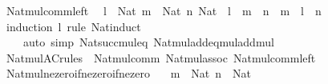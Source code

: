 \begin{isabellebody}
\endisatagproof
{\isafoldproof}%
%
\isadelimproof
\isanewline
%
\endisadelimproof
\isanewline
{}\isamarkupfalse%
\ Nat{\isacharunderscore}{\kern0pt}mul{\isacharunderscore}{\kern0pt}comm{\isacharunderscore}{\kern0pt}left{\isacharcolon}{\kern0pt}\isanewline
\ \ {\isachardoublequoteopen}{\isasymlbrakk}l\ {\isacharcolon}{\kern0pt}\ Nat{\isacharsemicolon}{\kern0pt}\ m\ {\isacharcolon}{\kern0pt}\ Nat{\isacharsemicolon}{\kern0pt}\ n{\isacharcolon}{\kern0pt}\ Nat{\isasymrbrakk}\ {\isasymLongrightarrow}\ l\ {\isacharasterisk}{\kern0pt}\ {\isacharparenleft}{\kern0pt}m\ {\isacharasterisk}{\kern0pt}\ n{\isacharparenright}{\kern0pt}\ {\isacharequal}{\kern0pt}\ m\ {\isacharasterisk}{\kern0pt}\ {\isacharparenleft}{\kern0pt}l\ {\isacharasterisk}{\kern0pt}\ n{\isacharparenright}{\kern0pt}{\isachardoublequoteclose}\isanewline
%
\isadelimproof
\ \ %
\endisadelimproof
%
\isatagproof
{}\isamarkupfalse%
\ {\isacharparenleft}{\kern0pt}induction\ l\ rule{\isacharcolon}{\kern0pt}\ Nat{\isacharunderscore}{\kern0pt}induct{\isacharparenright}{\kern0pt}\isanewline
\ \ \ \ {\isacharparenleft}{\kern0pt}auto\ simp{\isacharcolon}{\kern0pt}\ Nat{\isacharunderscore}{\kern0pt}succ{\isacharunderscore}{\kern0pt}mul{\isacharunderscore}{\kern0pt}eq\ Nat{\isacharunderscore}{\kern0pt}mul{\isacharunderscore}{\kern0pt}add{\isacharunderscore}{\kern0pt}eq{\isacharunderscore}{\kern0pt}mul{\isacharunderscore}{\kern0pt}add{\isacharunderscore}{\kern0pt}mul{\isacharparenright}{\kern0pt}%
\endisatagproof
{\isafoldproof}%
%
\isadelimproof
\isanewline
%
\endisadelimproof
\isanewline
{}\isamarkupfalse%
\ Nat{\isacharunderscore}{\kern0pt}mul{\isacharunderscore}{\kern0pt}AC{\isacharunderscore}{\kern0pt}rules\ {\isacharequal}{\kern0pt}\ Nat{\isacharunderscore}{\kern0pt}mul{\isacharunderscore}{\kern0pt}comm\ Nat{\isacharunderscore}{\kern0pt}mul{\isacharunderscore}{\kern0pt}assoc\ Nat{\isacharunderscore}{\kern0pt}mul{\isacharunderscore}{\kern0pt}comm{\isacharunderscore}{\kern0pt}left\isanewline
\isanewline
{}\isamarkupfalse%
\ Nat{\isacharunderscore}{\kern0pt}mul{\isacharunderscore}{\kern0pt}ne{\isacharunderscore}{\kern0pt}zero{\isacharunderscore}{\kern0pt}if{\isacharunderscore}{\kern0pt}ne{\isacharunderscore}{\kern0pt}zero{\isacharunderscore}{\kern0pt}if{\isacharunderscore}{\kern0pt}ne{\isacharunderscore}{\kern0pt}zero{\isacharcolon}{\kern0pt}\isanewline
\ \ \ {\isachardoublequoteopen}m\ {\isacharcolon}{\kern0pt}\ Nat{\isachardoublequoteclose}\ {\isachardoublequoteopen}n\ {\isacharcolon}{\kern0pt}\ Nat{\isachardoublequoteclose}\isanewline

\end{isabellebody}
